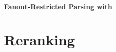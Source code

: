 \documentclass[../document.tex]{subfiles}
\begin{document}
    \paragraph{Fanout-Restricted Parsing with }

    \section{Reranking}

    \printindex
\end{document}
